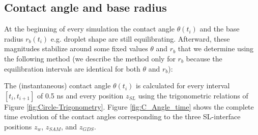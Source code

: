 \subsection{Contact angle and base radius}

At the beginning of every simulation the contact angle $\theta(t_{i})$
and the base radius $r_{b}(t_{i})$ \textendash{} e.g. droplet shape
\textendash{} are still equilibrating. Afterward, these magnitudes
stabilize around some fixed values $\theta$ and $r_{b}$ that we
determine using the following method (we describe the method only
for $r_{b}$ because the equilibration intervals are identical for
both $\theta$ and $r_{b}$):

The (instantaneous) contact angle $\theta(t_{i})$ is calculated for
every interval $\left[t_{i},t_{i+1}\right]$ of 0.5 ns and every position
$z_{SL}$ using the trigonometric relations of Figure \ref{fig:Circle-Trigonometry}.
Figure \ref{fig:C_Angle_time} shows the complete time evolution of
the contact angles corresponding to the three SL-interface positions
$z_{w}$, $z_{SAM}$, and $z_{GDS}$.